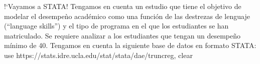 \begin{frame}{!`Vayamos a STATA!}
	Tengamos en cuenta un estudio que tiene el objetivo de modelar el desempe\`no académico como una función de las destrezas de lenguaje (``language skills'') y el tipo de programa en el que los estudiantes se han matriculado. Se requiere analizar a los estudiantes que tengan un desempe\~no mínimo de 40. Tengamos en cuenta la siguiente base de datos en formato STATA:
	\\
	use https://stats.idre.ucla.edu/stat/stata/dae/truncreg, clear
\end{frame}

